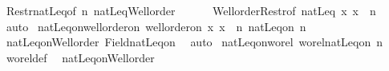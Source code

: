 \begin{isabellebody}
\ Restr{\isacharunderscore}{\kern0pt}natLeq{\isacharbrackleft}{\kern0pt}of\ n{\isacharbrackright}{\kern0pt}\ natLeq{\isacharunderscore}{\kern0pt}Well{\isacharunderscore}{\kern0pt}order\isanewline
\ \ \ \ \ \ Well{\isacharunderscore}{\kern0pt}order{\isacharunderscore}{\kern0pt}Restr{\isacharbrackleft}{\kern0pt}of\ natLeq\ {\isachardoublequoteopen}{\isacharbraceleft}{\kern0pt}x{\isachardot}{\kern0pt}\ x\ {\isacharless}{\kern0pt}\ n{\isacharbraceright}{\kern0pt}{\isachardoublequoteclose}{\isacharbrackright}{\kern0pt}\ \isamarkupfalse%
\ auto%
\endisatagproof
{\isafoldproof}%
%
\isadelimproof
\isanewline
%
\endisadelimproof
\isanewline
{}\isamarkupfalse%
\ natLeq{\isacharunderscore}{\kern0pt}on{\isacharunderscore}{\kern0pt}well{\isacharunderscore}{\kern0pt}order{\isacharunderscore}{\kern0pt}on{\isacharcolon}{\kern0pt}\ {\isachardoublequoteopen}well{\isacharunderscore}{\kern0pt}order{\isacharunderscore}{\kern0pt}on\ {\isacharbraceleft}{\kern0pt}x{\isachardot}{\kern0pt}\ x\ {\isacharless}{\kern0pt}\ n{\isacharbraceright}{\kern0pt}\ {\isacharparenleft}{\kern0pt}natLeq{\isacharunderscore}{\kern0pt}on\ n{\isacharparenright}{\kern0pt}{\isachardoublequoteclose}\isanewline
%
\isadelimproof
%
\endisadelimproof
%
\isatagproof
{}\isamarkupfalse%
\ natLeq{\isacharunderscore}{\kern0pt}on{\isacharunderscore}{\kern0pt}Well{\isacharunderscore}{\kern0pt}order\ Field{\isacharunderscore}{\kern0pt}natLeq{\isacharunderscore}{\kern0pt}on\ \isamarkupfalse%
\ auto%
\endisatagproof
{\isafoldproof}%
%
\isadelimproof
\isanewline
%
\endisadelimproof
\isanewline
{}\isamarkupfalse%
\ natLeq{\isacharunderscore}{\kern0pt}on{\isacharunderscore}{\kern0pt}wo{\isacharunderscore}{\kern0pt}rel{\isacharcolon}{\kern0pt}\ {\isachardoublequoteopen}wo{\isacharunderscore}{\kern0pt}rel{\isacharparenleft}{\kern0pt}natLeq{\isacharunderscore}{\kern0pt}on\ n{\isacharparenright}{\kern0pt}{\isachardoublequoteclose}\isanewline
%
\isadelimproof
%
\endisadelimproof
%
\isatagproof
{}\isamarkupfalse%
\ wo{\isacharunderscore}{\kern0pt}rel{\isacharunderscore}{\kern0pt}def\ \isamarkupfalse%
\ natLeq{\isacharunderscore}{\kern0pt}on{\isacharunderscore}{\kern0pt}Well{\isacharunderscore}{\kern0pt}order\ \isacommand{{\isachardot}{\kern0pt}}\isamarkupfalse%
%
\endisatagproof
{\isafoldproof}%
%
\isadelimproof
%
\endisadelimproof
%
\isadelimdocument
%
\endisadelimdocument
%
\isatagdocument
%
\isamarkuptrue%
%
\endisatagdocument
{\isafolddocument}%
%
\isadelimdocument

\end{isabellebody}
